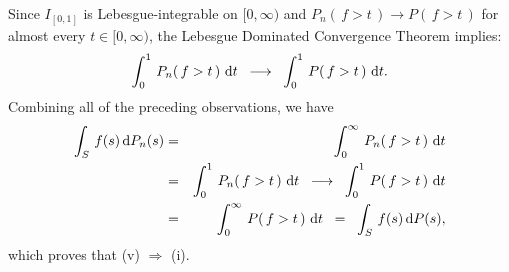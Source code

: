 Since $I_{[0,1]}$ is Lebesgue-integrable on $[0,\infty)$ and
$P_{n}\!\left(\,f > t\,\right) \longrightarrow P\!\left(\,f > t\,\right)$
for almost every $t \in [0,\infty)$,
the Lebesgue Dominated Convergence Theorem implies:
\begin{equation*}
\int_{0}^{1}\,P_{n}\!\left(\,f > t\,\right)\,\textnormal{d} t \;\;\longrightarrow\;\; \int_{0}^{1}\,P\!\left(\,f > t\,\right)\,\textnormal{d} t.
\end{equation*}
Combining all of the preceding observations, we have
\begin{eqnarray*}
\int_{S}\,f(s)\,\textnormal{d} P_{n}(s) &=& \int_{0}^{\infty}\,P_{n}\!\left(\,f > t\,\right)\,\textnormal{d} t
\\
&=& \int_{0}^{1}\,P_{n}\!\left(\,f > t\,\right)\,\textnormal{d} t \;\;\longrightarrow\;\; \int_{0}^{1}\,P\!\left(\,f > t\,\right)\,\textnormal{d} t
\\
&=& \int_{0}^{\infty}\,P\!\left(\,f > t\,\right)\,\textnormal{d} t
\;\;=\;\; \int_{S}\,f(s)\,\textnormal{d} P(s),
\end{eqnarray*}
which proves that (v) $\Longrightarrow$ (i).
